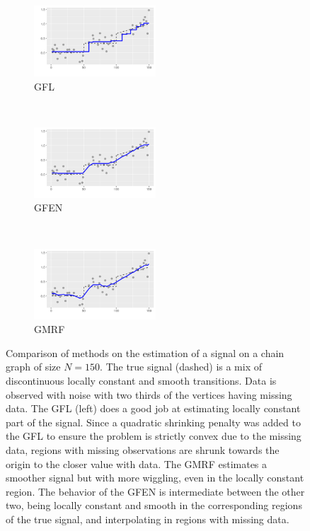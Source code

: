 \documentclass[a4paper, 11pt]{article}
\begin{document}
\begin{figure}[tb]
    \centering
    \begin{subfigure}[tb]{.3\linewidth}
        \centering
        \includegraphics[width=0.98\linewidth, height=100px]{img/benchmarks_linear_fl.png}
        \caption{\footnotesize GFL}
    \end{subfigure}%
    ~
    \begin{subfigure}[tb]{.3\linewidth}
        \centering
        \includegraphics[width=0.98\linewidth, height=100px]{img/benchmarks_linear_enet.png}
        \caption{GFEN}
    \end{subfigure}
    ~
    \begin{subfigure}[tb]{.3\linewidth}
        \centering
        \includegraphics[width=0.98\linewidth, height=100px]{img/benchmarks_linear_kal.png}
        \caption{\footnotesize GMRF}
    \end{subfigure}%
    \caption{Comparison of methods on the estimation of a signal on a chain graph of size $N=150$. The true signal (dashed) is a mix of discontinuous locally constant and smooth transitions. Data is observed with noise with two thirds of the vertices having missing data. The GFL (left) does a good job at estimating locally constant part of the signal. Since a quadratic shrinking penalty was added to the GFL to ensure the problem is strictly convex due to the missing data, regions with missing observations are shrunk towards the origin to the closer value with data. The GMRF estimates a smoother signal but with more wiggling, even in the locally constant region. The behavior of the GFEN is intermediate between the other two, being locally constant and smooth in the corresponding regions of the true signal, and interpolating in regions with missing data.} 
    \label{fig:benchmarks-linear}
\end{figure}
\end{document}
